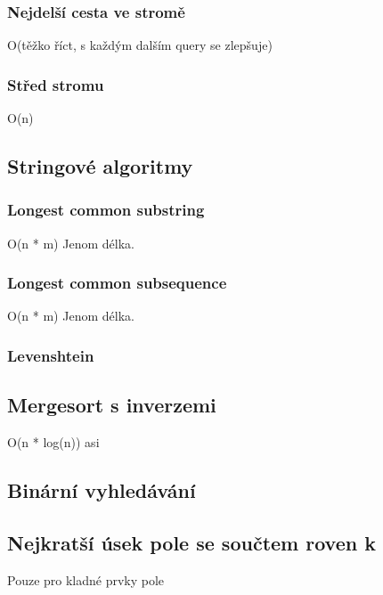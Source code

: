 \documentclass[10pt, a4paper]{article}
\begin{document}
\subsubsection{Nejdelší cesta ve stromě}
O(těžko říct, s každým dalším query se zlepšuje)


\subsubsection{Střed stromu}
O(n)



\subsection{Stringové algoritmy}
\subsubsection{Longest common substring}
O(n * m)
Jenom délka.


\subsubsection{Longest common subsequence}
O(n * m)
Jenom délka.


\subsubsection{Levenshtein}


\subsection{Mergesort s inverzemi}
O(n * log(n)) asi


\subsection{Binární vyhledávání}


\subsection{Nejkratší úsek pole se součtem roven k}
Pouze pro kladné prvky pole

\end{document}
